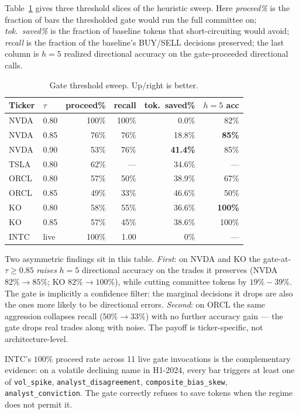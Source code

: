\documentclass[conference]{IEEEtran}
\begin{document}
Table~\ref{tab:pareto} gives three threshold slices of the heuristic
sweep. Here \emph{proceed\%} is the fraction of bars the thresholded
gate would run the full committee on; \emph{tok.\ saved\%} is the
fraction of baseline tokens that short-circuiting would avoid;
\emph{recall} is the fraction of the baseline's BUY/SELL decisions
preserved; the last column is $h{=}5$ realized directional accuracy
on the gate-proceeded directional calls.

\begin{table}[t]
\caption{Gate threshold sweep. Up/right is better.}
\label{tab:pareto}
\centering\footnotesize
\begin{tabular}{llrrrr}
\toprule
Ticker & $\tau$ & proceed\% & recall & tok.\ saved\% & $h{=}5$ acc \\
\midrule
NVDA & 0.80 & 100\% & 100\% &  0.0\% & 82\% \\
NVDA & 0.85 & 76\%  & 76\%  & 18.8\% & \textbf{85\%} \\
NVDA & 0.90 & 53\%  & 76\%  & \textbf{41.4\%} & 85\% \\
\midrule
TSLA & 0.80 & 62\%  & ---   & 34.6\% & --- \\
\midrule
ORCL & 0.80 & 57\%  & 50\%  & 38.9\% & 67\% \\
ORCL & 0.85 & 49\%  & 33\%  & 46.6\% & 50\% \\
\midrule
KO   & 0.80 & 58\%  & 55\%  & 36.6\% & \textbf{100\%} \\
KO   & 0.85 & 57\%  & 45\%  & 38.6\% & 100\% \\
\midrule
INTC & live & 100\% & 1.00 & 0\% & --- \\
\bottomrule
\end{tabular}
\end{table}

Two asymmetric findings sit in this table. \emph{First}: on NVDA and
KO the gate-at-$\tau{\geq}0.85$ \emph{raises} $h{=}5$ directional
accuracy on the trades it preserves (NVDA $82\%{\to}85\%$; KO
$82\%{\to}100\%$), while cutting committee tokens by $19\%{-}39\%$.
The gate is implicitly a confidence filter: the marginal decisions
it drops are also the ones more likely to be directional errors.
\emph{Second}: on ORCL the same aggression collapses recall
($50\%{\to}33\%$) with no further accuracy gain --- the gate drops
real trades along with noise. The payoff is ticker-specific, not
architecture-level.

INTC's $100\%$ proceed rate across 11 live gate invocations is the
complementary evidence: on a volatile declining name in H1-2024,
every bar triggers at least one of
\texttt{vol\_spike}, \texttt{analyst\_disagreement},
\texttt{composite\_bias\_skew}, \texttt{analyst\_conviction}.
The gate correctly refuses to save tokens when the regime does not
permit it.
\end{document}
